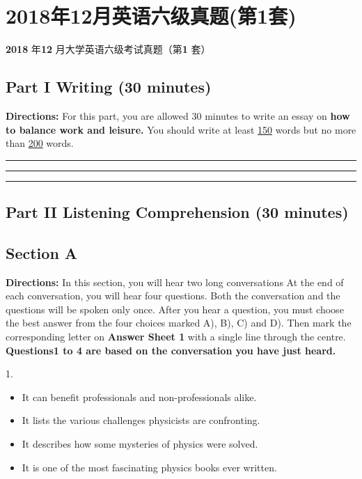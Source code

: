 \documentclass[UTF8,11pt]{ctexart}
\begin{document}
\section*{2018年12月英语六级真题(第1套)}
\textbf{2018} 年\textbf{12} 月大学英语六级考试真题（第\textbf{1} 套）


\subsection*{\textbf{Part I} \textbf{Writing} \textbf{(30 minutes)}}


\textbf{Directions:} For this part, you are allowed 30 minutes to write an essay on\textbf{ how to balance work and leisure.} You should write at least \uline{150} words but no more than \uline{200} words. \par\noindent\rule{.95\linewidth}{.4pt}\par  \par\noindent\rule{.95\linewidth}{.4pt}\par  \par\noindent\rule{.95\linewidth}{.4pt}\par


\subsection*{\textbf{Part II} \textbf{Listening Comprehension} \textbf{(30 minutes)}}


\subsection*{\textbf{Section A}}


\textbf{Directions:} In this section, you will hear two long conversations At the end of each conversation, you will hear four questions. Both the conversation and the questions will be spoken only once. After you hear a question, you must choose the best answer from the four choices marked A), B), C) and D). Then mark the corresponding letter on\textbf{ Answer Sheet 1} with a single line through the centre. \textbf{Questions1 to 4 are based on the conversation you have just heard.}


1.


\begin{itemize}[leftmargin=2em,itemsep=.2em,topsep=.4em]\item[A.] It can benefit professionals and non-professionals alike.
\item[B.] It lists the various challenges physicists are confronting.
\item[C.] It describes how some mysteries of physics were solved.
\item[D.] It is one of the most fascinating physics books ever written.
\end{itemize}
\end{document}
